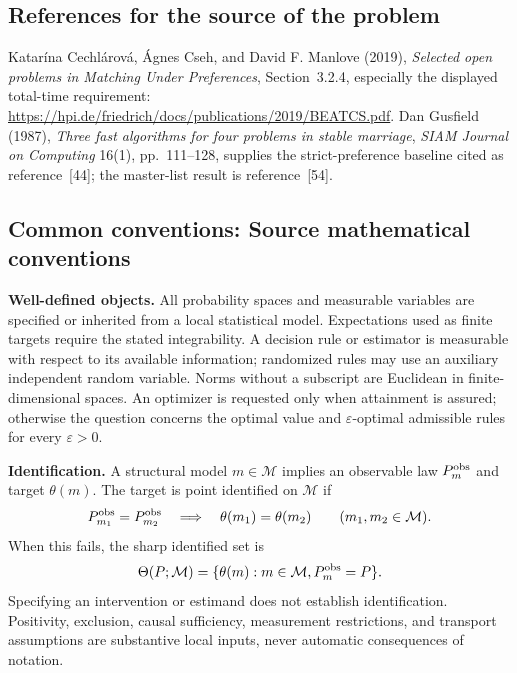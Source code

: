 \documentclass[11pt,a4paper]{article}
\begin{document}
\subsection*{References for the source of the problem}
Katar\'ina Cechl\'arov\'a, \'Agnes Cseh, and David F. Manlove (2019), \emph{Selected open problems in Matching Under Preferences}, Section~3.2.4, especially the displayed total-time requirement: \url{https://hpi.de/friedrich/docs/publications/2019/BEATCS.pdf}. Dan Gusfield (1987), \emph{Three fast algorithms for four problems in stable marriage}, \emph{SIAM Journal on Computing} 16(1), pp.~111--128, supplies the strict-preference baseline cited as reference~[44]; the master-list result is reference~[54].

\subsection*{Common conventions: Source mathematical conventions}

\textbf{Well-defined objects.}
All probability spaces and measurable variables are specified or inherited
from a local statistical model. Expectations used as finite targets require
the stated integrability. A decision rule or estimator is measurable with
respect to its available information; randomized rules may use an auxiliary
independent random variable. Norms without a subscript are Euclidean in
finite-dimensional spaces. An optimizer is requested only when attainment
is assured; otherwise the question concerns the optimal value and
$\varepsilon$-optimal admissible rules for every $\varepsilon>0$.

\textbf{Identification.}
A structural model $m\in\mathcal M$ implies an observable law
$P_m^{\rm obs}$ and target $\theta(m)$. The target is point identified on
$\mathcal M$ if
\[
 P_{m_1}^{\rm obs}=P_{m_2}^{\rm obs}
 \quad\Longrightarrow\quad\theta(m_1)=\theta(m_2)
 \qquad(m_1,m_2\in\mathcal M).
\]
When this fails, the sharp identified set is
\[
 \Theta(P;\mathcal M)=\{\theta(m):m\in\mathcal M,
                                  P_m^{\rm obs}=P\}.
\]
Specifying an intervention or estimand does not establish identification.
Positivity, exclusion, causal sufficiency, measurement restrictions, and
transport assumptions are substantive local inputs, never automatic
consequences of notation.
\end{document}
